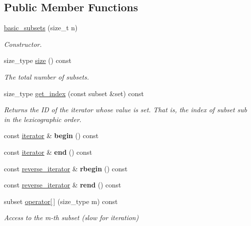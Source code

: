 \subsection*{Public Member Functions}
\begin{DoxyCompactItemize}
\item 
\hyperlink{classdscr_1_1basic__subsets_aa128a82ad4a53aed7eb95b92720da221}{basic\-\_\-subsets} (size\-\_\-t n)
\begin{DoxyCompactList}\small\item\em Constructor. \end{DoxyCompactList}\item 
size\-\_\-type \hyperlink{classdscr_1_1basic__subsets_a084df4f877fa914fba387855c294038c}{size} () const 
\begin{DoxyCompactList}\small\item\em The total number of subsets. \end{DoxyCompactList}\item 
size\-\_\-type \hyperlink{classdscr_1_1basic__subsets_a4307cedb0c0a50bfdc1e0862bfb2fde6}{get\-\_\-index} (const subset \&set) const 
\begin{DoxyCompactList}\small\item\em Returns the I\-D of the iterator whose value is set. That is, the index of subset sub in the lexicographic order. \end{DoxyCompactList}\item 
\hypertarget{classdscr_1_1basic__subsets_aebf57871842b0be8b3bdb1f10997f8cd}{const \hyperlink{classdscr_1_1basic__subsets_1_1iterator}{iterator} \& {\bfseries begin} () const }\label{classdscr_1_1basic__subsets_aebf57871842b0be8b3bdb1f10997f8cd}

\item 
\hypertarget{classdscr_1_1basic__subsets_af7b36cdeefd4ee7dd116e97d0497938a}{const \hyperlink{classdscr_1_1basic__subsets_1_1iterator}{iterator} \& {\bfseries end} () const }\label{classdscr_1_1basic__subsets_af7b36cdeefd4ee7dd116e97d0497938a}

\item 
\hypertarget{classdscr_1_1basic__subsets_a56bb0392fedd232d845cd1baff5a77e3}{const \hyperlink{classdscr_1_1basic__subsets_1_1reverse__iterator}{reverse\-\_\-iterator} \& {\bfseries rbegin} () const }\label{classdscr_1_1basic__subsets_a56bb0392fedd232d845cd1baff5a77e3}

\item 
\hypertarget{classdscr_1_1basic__subsets_aaae5345c08e1c20ba900310325195c97}{const \hyperlink{classdscr_1_1basic__subsets_1_1reverse__iterator}{reverse\-\_\-iterator} \& {\bfseries rend} () const }\label{classdscr_1_1basic__subsets_aaae5345c08e1c20ba900310325195c97}

\item 
subset \hyperlink{classdscr_1_1basic__subsets_a5e9931e3569106ece77d4e8ef9a07055}{operator\mbox{[}$\,$\mbox{]}} (size\-\_\-type m) const 
\begin{DoxyCompactList}\small\item\em Access to the m-\/th subset (slow for iteration) \end{DoxyCompactList}\end{DoxyCompactItemize}
